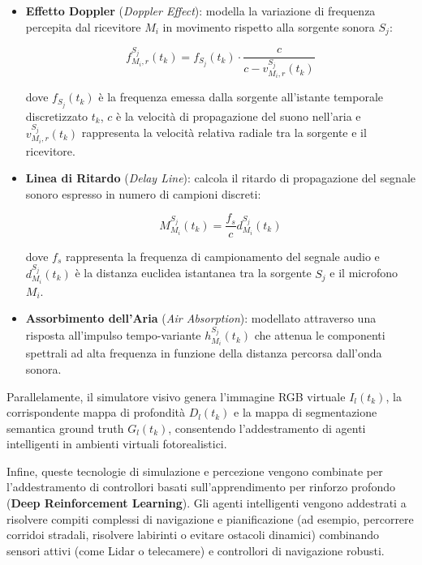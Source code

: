 ﻿\documentclass[11pt, a4paper]{article}
\begin{document}
\begin{itemize}[noitemsep]
    \item \textbf{Effetto Doppler} (\emph{Doppler Effect}): modella la variazione di frequenza percepita dal ricevitore $M_i$ in movimento rispetto alla sorgente sonora $S_j$:

    \[
    f^{S_j}_{M_i, r}(t_k) = f_{S_j}(t_k) \cdot \frac{c}{c - v^{S_j}_{M_i, r}(t_k)}
    \]

    dove $f_{S_j}(t_k)$ è la frequenza emessa dalla sorgente all'istante temporale discretizzato $t_k$, $c$ è la velocità di propagazione del suono nell'aria e $v^{S_j}_{M_i, r}(t_k)$ rappresenta la velocità relativa radiale tra la sorgente e il ricevitore.

    \item \textbf{Linea di Ritardo} (\emph{Delay Line}): calcola il ritardo di propagazione del segnale sonoro espresso in numero di campioni discreti:

    \[
    M^{S_j}_{M_i}(t_k) = \frac{f_s}{c} d^{S_j}_{M_i}(t_k)
    \]

    dove $f_s$ rappresenta la frequenza di campionamento del segnale audio e $d^{S_j}_{M_i}(t_k)$ è la distanza euclidea istantanea tra la sorgente $S_j$ e il microfono $M_i$.

    \item \textbf{Assorbimento dell'Aria} (\emph{Air Absorption}): modellato attraverso una risposta all'impulso tempo-variante $h^{S_j}_{M_i}(t_k)$ che attenua le componenti spettrali ad alta frequenza in funzione della distanza percorsa dall'onda sonora.
\end{itemize}

Parallelamente, il simulatore visivo genera l'immagine RGB virtuale $I_l(t_k)$, la corrispondente mappa di profondità $D_l(t_k)$ e la mappa di segmentazione semantica ground truth $G_l(t_k)$, consentendo l'addestramento di agenti intelligenti in ambienti virtuali fotorealistici.


Infine, queste tecnologie di simulazione e percezione vengono combinate per l'addestramento di controllori basati sull'apprendimento per rinforzo profondo (\textbf{Deep Reinforcement Learning}). Gli agenti intelligenti vengono addestrati a risolvere compiti complessi di navigazione e pianificazione (ad esempio, percorrere corridoi stradali, risolvere labirinti o evitare ostacoli dinamici) combinando sensori attivi (come Lidar o telecamere) e controllori di navigazione robusti.

\end{document}
